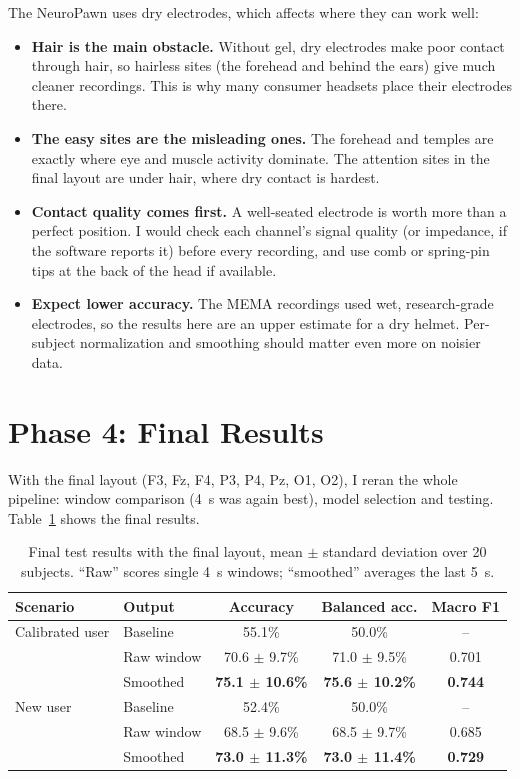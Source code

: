 \documentclass[12pt]{article}
\begin{document}
The NeuroPawn uses dry electrodes, which affects where they can work well:
\begin{itemize}
    \item \textbf{Hair is the main obstacle.} Without gel, dry electrodes make poor contact through hair, so hairless sites (the forehead and behind the ears) give much cleaner recordings. This is why many consumer headsets place their electrodes there.
    \item \textbf{The easy sites are the misleading ones.} The forehead and temples are exactly where eye and muscle activity dominate. The attention sites in the final layout are under hair, where dry contact is hardest.
    \item \textbf{Contact quality comes first.} A well-seated electrode is worth more than a perfect position. I would check each channel's signal quality (or impedance, if the software reports it) before every recording, and use comb or spring-pin tips at the back of the head if available.
    \item \textbf{Expect lower accuracy.} The MEMA recordings used wet, research-grade electrodes, so the results here are an upper estimate for a dry helmet. Per-subject normalization and smoothing should matter even more on noisier data.
\end{itemize}

\section{Phase 4: Final Results}

With the final layout (F3, Fz, F4, P3, P4, Pz, O1, O2), I reran the whole pipeline: window comparison (4~s was again best), model selection and testing. Table~\ref{tab:results} shows the final results.

\begin{table}[H]
\centering
\caption{Final test results with the final layout, mean $\pm$ standard deviation over 20 subjects. ``Raw'' scores single 4~s windows; ``smoothed'' averages the last 5~s.}
\label{tab:results}
\begin{tabular}{llccc}
\toprule
Scenario & Output & Accuracy & Balanced acc. & Macro F1 \\
\midrule
Calibrated user & Baseline & 55.1\% & 50.0\% & -- \\
 & Raw window & 70.6 $\pm$ 9.7\% & 71.0 $\pm$ 9.5\% & 0.701 \\
 & Smoothed & \textbf{75.1 $\pm$ 10.6\%} & \textbf{75.6 $\pm$ 10.2\%} & \textbf{0.744} \\
\midrule
New user & Baseline & 52.4\% & 50.0\% & -- \\
 & Raw window & 68.5 $\pm$ 9.6\% & 68.5 $\pm$ 9.7\% & 0.685 \\
 & Smoothed & \textbf{73.0 $\pm$ 11.3\%} & \textbf{73.0 $\pm$ 11.4\%} & \textbf{0.729} \\
\bottomrule
\end{tabular}
\end{table}
\end{document}
